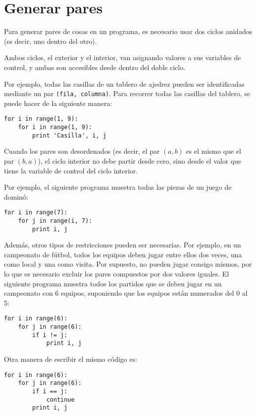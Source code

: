 \section{Generar pares}

Para generar pares de cosas en un programa, es necesario usar dos ciclos
anidados (es decir, uno dentro del otro).

Ambos ciclos, el exterior y el interior, van asignando valores a sus
variables de control, y ambas son accesibles desde dentro del doble
ciclo.

Por ejemplo, todas las casillas de un tablero de ajedrez pueden ser
identificadas mediante un par \lstinline!(fila, columna)!. Para recorrer
todas las casillas del tablero, se puede hacer de la siguiente manera:

\begin{lstlisting}
for i in range(1, 9):
    for i in range(1, 9):
        print 'Casilla', i, j
\end{lstlisting}

Cuando los pares son desordenados (es decir, el par \((a, b)\) es el mismo
que el par \((b, a)\)), el ciclo interior no debe partir desde cero, sino
desde el valor que tiene la variable de control del ciclo interior.

Por ejemplo, el siguiente programa muestra todas las piezas de un juego
de dominó:

\begin{lstlisting}
for i in range(7):
    for j in range(i, 7):
        print i, j
\end{lstlisting}

Además, otros tipos de restricciones pueden ser necesarias. Por ejemplo,
en un campeonato de fútbol, todos los equipos deben jugar entre ellos
dos veces, una como local y una como visita. Por supuesto, no pueden
jugar consigo mismos, por lo que es necesario excluir los pares
compuestos por dos valores iguales. El siguiente programa muestra todos
los partidos que se deben jugar en un campeonato con 6 equipos,
suponiendo que los equipos están numerados del 0 al 5:

\begin{lstlisting}
for i in range(6):
    for j in range(6):
        if i != j:
            print i, j
\end{lstlisting}

Otra manera de escribir el mismo código es:

\begin{lstlisting}
for i in range(6):
    for j in range(6):
        if i == j:
            continue
        print i, j
\end{lstlisting}

